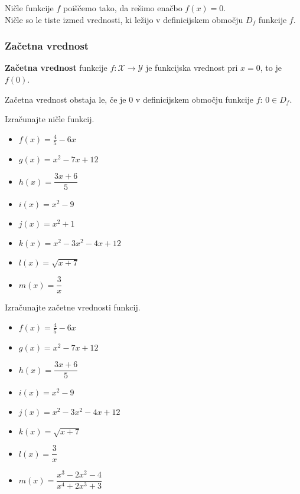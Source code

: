         Ničle funkcije $f$ poiščemo tako, da rešimo enačbo $f(x)=0$. \\
        Ničle so le tiste izmed vrednosti, ki ležijo v definicijskem območju $D_f$ funkcije $f$.

        
    \subsubsection*{Začetna vrednost}
        \textbf{Začetna vrednost} funkcije $f:\mathcal{X}\to\mathcal{Y}$ je funkcijska vrednost pri $x=0$, to je $f(0)$.

        Začetna vrednost obstaja le, če je $0$ v definicijskem območju funkcije $f$: $0\in D_f$.

        





    \begin{naloga}
        Izračunajte ničle funkcij.
            \begin{itemize}
                \item $f(x)=\frac{4}{5}-6x$ 
                \item $g(x)=x^2-7x+12$ 
                \item $h(x)=\dfrac{3x+6}{5}$ 
                \item $i(x)=x^2-9$ 
                \item $j(x)=x^2+1$ 
                \item $k(x)=x^2-3x^2-4x+12$ 
                \item $l(x)=\sqrt{x+7}$ 
                \item $m(x)=\dfrac{3}{x}$ 
            \end{itemize}

    \end{naloga}


    \begin{naloga}
        Izračunajte začetne vrednosti funkcij.
            \begin{itemize}
                \item $f(x)=\frac{4}{5}-6x$ 
                \item $g(x)=x^2-7x+12$ 
                \item $h(x)=\dfrac{3x+6}{5}$ 
                \item $i(x)=x^2-9$ 
                \item $j(x)=x^2-3x^2-4x+12$ 
                \item $k(x)=\sqrt{x+7}$ 
                \item $l(x)=\dfrac{3}{x}$ 
                \item $m(x)=\dfrac{x^3-2x^2-4}{x^4+2x^3+3}$ 
            \end{itemize}

    \end{naloga}


